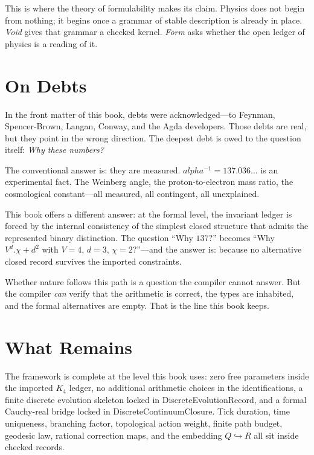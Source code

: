 \documentclass[11pt,a4paper]{book}
\def\alpha{alpha}%
\def\cdot{.}%
\def\mathbb#1{#1}%
\def\texttt#1{#1}%
\begin{document}
This is where the theory of formulability makes its claim. Physics does not begin from nothing; it begins once a grammar of stable description is already in place. \textit{Void} gives that grammar a checked kernel. \textit{Form} asks whether the open ledger of physics is a reading of it.

\section*{On Debts}

In the front matter of this book, debts were acknowledged---to Feynman, Spencer-Brown, Langan, Conway, and the Agda developers. Those debts are real, but they point in the wrong direction. The deepest debt is owed to the question itself: \emph{Why these numbers?}

The conventional answer is: they are measured. $\alpha^{-1} = 137.036\ldots$ is an experimental fact. The Weinberg angle, the proton-to-electron mass ratio, the cosmological constant---all measured, all contingent, all unexplained.

This book offers a different answer: at the formal level, the invariant ledger is forced by the internal consistency of the simplest closed structure that admits the represented binary distinction. The question ``Why $137$?'' becomes ``Why $V^d \cdot \chi + d^2$ with $V = 4$, $d = 3$, $\chi = 2$?''---and the answer is: because no alternative closed record survives the imported constraints.

Whether nature follows this path is a question the compiler cannot answer. But the compiler \emph{can} verify that the arithmetic is correct, the types are inhabited, and the formal alternatives are empty. That is the line this book keeps.

\section*{What Remains}

The framework is complete at the level this book uses: zero free parameters inside the imported $K_4$ ledger, no additional arithmetic choices in the identifications, a finite discrete evolution skeleton locked in \texttt{DiscreteEvolutionRecord}, and a formal Cauchy-real bridge locked in \texttt{DiscreteContinuumClosure}. Tick duration, time uniqueness, branching factor, topological action weight, finite path budget, geodesic law, rational correction maps, and the embedding $\mathbb{Q} \hookrightarrow \mathbb{R}$ all sit inside checked records.
\end{document}
